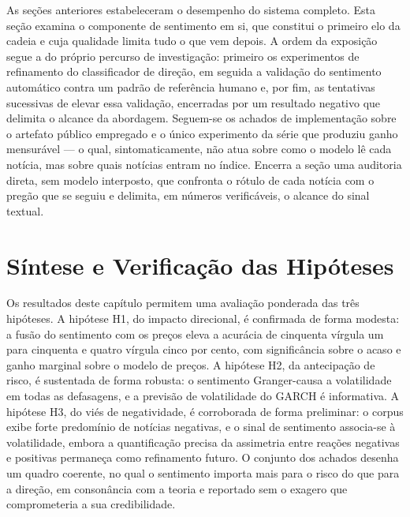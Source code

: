 As seções anteriores estabeleceram o desempenho do sistema completo. Esta seção examina o
componente de sentimento em si, que constitui o primeiro elo da cadeia e cuja qualidade limita
tudo o que vem depois. A ordem da exposição segue a do próprio percurso de investigação: primeiro
os experimentos de refinamento do classificador de direção, em seguida a validação do sentimento
automático contra um padrão de referência humano e, por fim, as tentativas sucessivas de elevar
essa validação, encerradas por um resultado negativo que delimita o alcance da abordagem. Seguem-se
os achados de implementação sobre o artefato público empregado e o único experimento da série que
produziu ganho mensurável --- o qual, sintomaticamente, não atua sobre como o modelo lê cada notícia,
mas sobre quais notícias entram no índice. Encerra a seção uma auditoria direta, sem modelo
interposto, que confronta o rótulo de cada notícia com o pregão que se seguiu e delimita, em números
verificáveis, o alcance do sinal textual.

















\section{Síntese e Verificação das Hipóteses}

Os resultados deste capítulo permitem uma avaliação ponderada das três hipóteses. A hipótese H1, do impacto direcional, é confirmada de forma modesta: a fusão do sentimento com os preços eleva a acurácia de cinquenta vírgula um para cinquenta e quatro vírgula cinco por cento, com significância sobre o acaso e ganho marginal sobre o modelo de preços. A hipótese H2, da antecipação de risco, é sustentada de forma robusta: o sentimento Granger-causa a volatilidade em todas as defasagens, e a previsão de volatilidade do GARCH é informativa. A hipótese H3, do viés de negatividade, é corroborada de forma preliminar: o corpus exibe forte predomínio de notícias negativas, e o sinal de sentimento associa-se à volatilidade, embora a quantificação precisa da assimetria entre reações negativas e positivas permaneça como refinamento futuro. O conjunto dos achados desenha um quadro coerente, no qual o sentimento importa mais para o risco do que para a direção, em consonância com a teoria e reportado sem o exagero que comprometeria a sua credibilidade.
